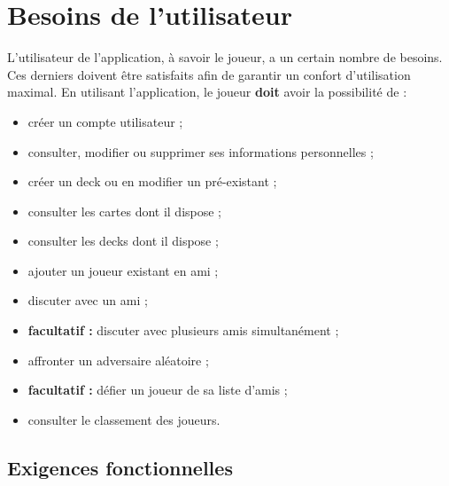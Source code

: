 \documentclass[12pt]{article}
\let\simplesection\section
\renewcommand{\section}{\clearpage\simplesection}
\let\simplesubsection\subsection
\renewcommand{\subsection}{
	\needspace{0.5\pagetotal}
	\simplesubsection
}
\newcommand{\doit}{\textbf{doit} }
\newcommand{\faclt}{\textbf{\gls{facultatif} : }}
\begin{document}
\section{Besoins de l'utilisateur}
	L'utilisateur de l'application, à savoir le joueur, a un certain nombre de besoins. Ces derniers doivent être satisfaits afin de garantir un confort d'utilisation
	maximal. En utilisant l'application, le joueur \doit avoir la possibilité de :

	\begin{itemize}
		\item créer un compte utilisateur ;
		\item consulter, modifier ou supprimer ses informations personnelles ; 
		\item créer un \gls{deck} ou en modifier un pré-existant ;
		\item consulter les cartes dont il dispose ;
		\item consulter les \glspl{deck} dont il dispose ;
		\item ajouter un joueur existant en ami ;
		\item discuter avec un ami ;
		\item \faclt discuter avec plusieurs amis simultanément ;
		\item affronter un adversaire aléatoire ;
		\item \faclt défier un joueur de sa liste d'amis ;
		\item consulter le classement des joueurs.
	\end{itemize}

	\subsection{Exigences fonctionnelles}
\end{document}
